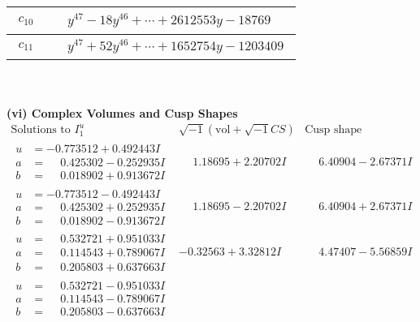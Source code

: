 \documentclass[1p]{elsarticle_modified}
\theoremstyle{definition}
\newcommand{\I}{\sqrt{-1}}
\begin{document}
\begin{tabular}{m{50pt}|m{274pt}}
\hline $$\begin{aligned}c_{10}\end{aligned}$$&$\begin{aligned}
&y^{47}-18 y^{46}+\cdots+2612553 y-18769
\end{aligned}$\\
\hline $$\begin{aligned}c_{11}\end{aligned}$$&$\begin{aligned}
&y^{47}+52 y^{46}+\cdots+1652754 y-1203409
\end{aligned}$\\
\hline
\end{tabular}\\~\\
\newpage\flushleft \textbf{(vi) Complex Volumes and Cusp Shapes}
$$\begin{array}{c|c|c}  
\text{Solutions to }I^u_{1}& \I (\text{vol} + \sqrt{-1}CS) & \text{Cusp shape}\\
 \hline 
\begin{aligned}
u &= -0.773512 + 0.492443 I \\
a &= \phantom{-}0.425302 - 0.252935 I \\
b &= \phantom{-}0.018902 + 0.913672 I\end{aligned}
 & \phantom{-}1.18695 + 2.20702 I & \phantom{-}6.40904 - 2.67371 I \\ \hline\begin{aligned}
u &= -0.773512 - 0.492443 I \\
a &= \phantom{-}0.425302 + 0.252935 I \\
b &= \phantom{-}0.018902 - 0.913672 I\end{aligned}
 & \phantom{-}1.18695 - 2.20702 I & \phantom{-}6.40904 + 2.67371 I \\ \hline\begin{aligned}
u &= \phantom{-}0.532721 + 0.951033 I \\
a &= \phantom{-}0.114543 + 0.789067 I \\
b &= \phantom{-}0.205803 + 0.637663 I\end{aligned}
 & -0.32563 + 3.32812 I & \phantom{-}4.47407 - 5.56859 I \\ \hline\begin{aligned}
u &= \phantom{-}0.532721 - 0.951033 I \\
a &= \phantom{-}0.114543 - 0.789067 I \\
b &= \phantom{-}0.205803 - 0.637663 I\end{aligned}

\end{array}$$
\end{document}
